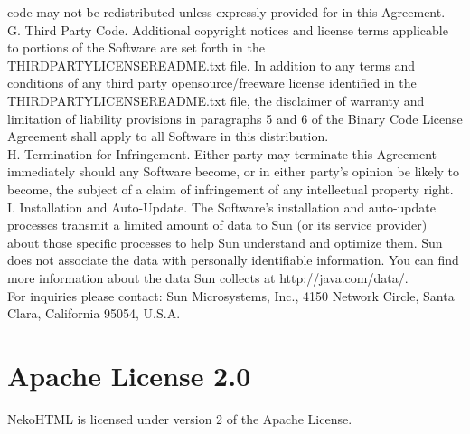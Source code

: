 {code may not be redistributed unless expressly provided for in this
Agreement.
\\[4pt]
G. Third Party Code. Additional copyright notices and license terms
applicable to portions of the Software are set forth in the
THIRDPARTYLICENSEREADME.txt file. In addition to any terms and
conditions of any third party opensource/freeware license identified
in the THIRDPARTYLICENSEREADME.txt file, the disclaimer of warranty
and limitation of liability provisions in paragraphs 5 and 6 of the
Binary Code License Agreement shall apply to all Software in this
distribution.
\\[4pt]
H. Termination for Infringement. Either party may terminate this
Agreement immediately should any Software become, or in either party's
opinion be likely to become, the subject of a claim of infringement of
any intellectual property right.
\\[4pt]
I. Installation and Auto-Update.  The Software's installation and
auto-update processes transmit a limited amount of data to Sun (or its
service provider) about those specific processes to help Sun
understand and optimize them.  Sun does not associate the data with
personally identifiable information.  You can find more information
about the data Sun collects at http://java.com/data/.
\\[4pt]
For inquiries please contact: Sun Microsystems, Inc., 4150 Network
Circle, Santa Clara, California 95054, U.S.A.
}

\section{Apache License 2.0}

\setlength{\baselineskip}{\oldbaselineskip}
\noindent
NekoHTML is licensed under version 2 of the Apache License.
\\

